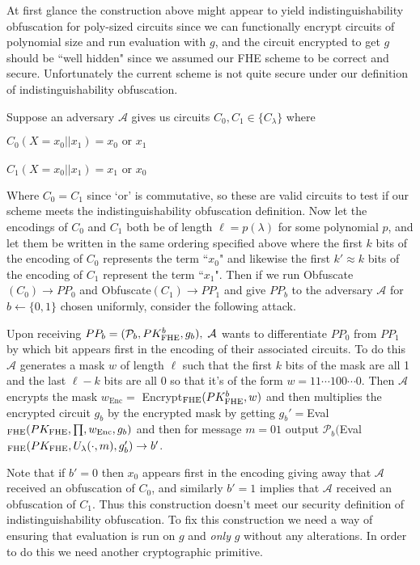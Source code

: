 \documentclass[12pt,twoside]{reedthesis}
\newcommand{\enc}[0]{\text{Enc}}
\begin{document}
    
    \par At first glance the construction above might appear to yield indistinguishability obfuscation for poly-sized circuits since we can functionally encrypt circuits of polynomial size and run evaluation with $g$, and the circuit encrypted to get $g$ should be ``well hidden" since we assumed our FHE scheme to be correct and secure. Unfortunately the current scheme is not quite secure under our definition of indistinguishability obfuscation. 
    \par Suppose an adversary $\mathcal{A}$ gives us circuits $C_0,C_1 \in \{ C_\lambda\}$ where 
   \begin{center}
    $C_0(X = x_0||x_1) = x_0 \text{ or } x_1$\\
     \\
   $C_1(X =x_0||x_1) = x_1 \text{ or } x_0$
    \end{center}
    Where $C_0 = C_1$ since `or' is commutative, so these are valid circuits to test if our scheme meets the indistinguishability obfuscation definition. Now let the encodings of $C_0$ and $C_1$ both be of length $\ell = p(\lambda)$ for some polynomial $p$, and let them be written in the same ordering specified above where the first $k$ bits of the encoding of $C_0$ represents the term ``$x_0$" and likewise the first $k' \approx k$ bits of the encoding of $C_1$ represent the term ``$x_1$". Then if we run Obfuscate$(C_0)\to PP_0$ and Obfuscate$(C_1) \to PP_1$ and give $PP_b$ to the adversary $\mathcal{A}$ for $b \leftarrow \{0,1\}$ chosen uniformly, consider the following attack.
    \par Upon receiving $PP_b =(\mathcal{P}_b,PK_\text{FHE}^b,g_b),\; \mathcal{A}$ wants to differentiate $PP_0$ from $PP_1$ by which bit appears first in the encoding of their associated circuits. To do this $\mathcal{A}$ generates a mask $w$ of length $\ell$ such that the first $k$ bits of the mask are all 1 and the last $\ell - k$ bits are all 0 so that it's of the form $w = 11\cdots 100 \cdots 0$. Then $\mathcal{A}$ encrypts the mask $w_\enc =$ Encrypt$_\text{FHE}(PK_\text{FHE}^b, w)$ and then multiplies the encrypted circuit $g_b$ by the encrypted mask by getting $g_b' =$Eval$\fhe(PK\fhe,\prod,w_\enc,g_b)$ and then for message $m=01$ output $\mathcal{P}_b($Eval$_\text{FHE}(PK_\text{FHE},U_\lambda(\cdot,m),g_b')\to b'$. 
    \par Note that if $b' = 0$ then $x_0$ appears first in the encoding giving away that $\mathcal{A}$ received an obfuscation of $C_0$, and similarly $b'=1$ implies that $\mathcal{A}$ received an obfuscation of $C_1$. Thus this construction doesn't meet our security definition of indistinguishability obfuscation. To fix this construction we need a way of ensuring that evaluation is run on $g$ and \textit{only} $g$ without any alterations. In order to do this we need another cryptographic primitive.
       
\end{document}
